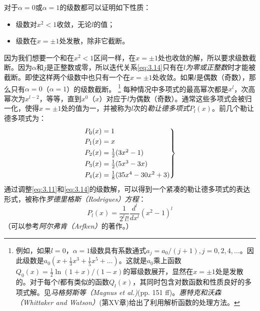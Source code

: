 \documentclass[12pt]{book}
\numberwithin{equation}{chapter}
\numberwithin{figure}{chapter}
\numberwithin{footnote}{page}
\begin{document}
对于$\alpha=0$或$\alpha=1$的级数都可以证明如下性质：
\begin{itemize}
    \item 级数对$x^2<1$收敛，无论$l$的值；
    \item 级数在$x=\pm 1$处发散，除非它截断。
\end{itemize}
因为我们想要一个和在$x^2<1$区间一样，在$x=\pm 1$处也收敛的解，所以要求级数截断。因为$\alpha$和$j$是正整数或零，所以迭代关系\autoref{eq:3.14}只有在$l$\textit{为零或正整数}时才能被截断。即使这样两个级数中也只有一个在$x=\pm1$处收敛。如果$l$是偶数（奇数），那么只有$\alpha=0$（$\alpha=1$）的级数截断。
\footnote{例如，如果$l=0$，$\alpha=1$级数具有系数通式$a_j=a_0/(j+1),j=0,2,4,\dots$。因此级数是$a_0(x+\frac{1}{3}x^3+\frac{1}{5}x^5+\dots)$。这就是$a_0$乘上函数$Q_0(x)=\frac{1}{2}\ln(1+x)/(1-x)$的幂级数展开，显然在$x=\pm 1$处是发散的。对于每个$l$都有类似的函数$Q_l(x)$，其同时包含对数函数和性质良好的多项式解。见\textit{马格努斯等（Magnus et al.)}(pp. 151 ff)。\textit{惠特克和沃森（Whittaker and Watson）}(第XV章)给出了利用解析函数的处理方法。}
每种情况中多项式的最高幂次都是$x^l$，次高幂次为$x^{l-2}$，等等，直到$x^0$（$x$）对应于$l$为偶数（奇数）。通常这些多项式会被归一化，使得$x=\pm 1$处的值为一，并被称为$l$次的\textit{勒让德多项式}$P_l(x)$。前几个勒让德多项式为：
\begin{equation}\label{eq:3.15}
    \begin{rcases*}
        P_0(x)=1\\
        P_1(x)=x\\
        P_2(x)=\frac{1}{2}(3x^2-1)\\
        P_3(x)=\frac{1}{2}(5x^3-3x)\\
        P_4(x)=\frac{1}{8}(35x^4-30x^2+3)\\
    \end{rcases*}
\end{equation}
通过调整\autoref{eq:3.11}和\autoref{eq:3.14}的级数解，可以得到一个紧凑的勒让德多项式的表达形式，被称作\textit{罗德里格斯（Rodrigues）方程}：
\begin{equation}\label{eq:3.16}
    P_l(x)=\frac{1}{2^l l!}\frac{d^l}{dx^l}(x^2-1)^l
\end{equation}
（可以参考\textit{阿尔弗肯（Arfken）}的著作。）
\end{document}
